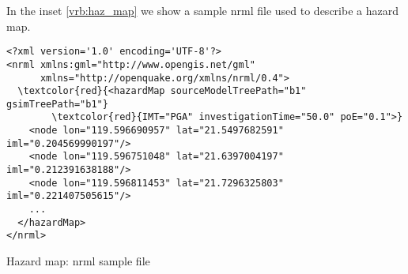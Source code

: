 In the inset \ref{vrb:haz_map} we show a sample nrml file used 
to describe a hazard map.
\begin{nrmlsmp}
\begin{Verbatim}[frame=single, commandchars=\\\{\}, fontsize=\small]
<?xml version='1.0' encoding='UTF-8'?>
<nrml xmlns:gml="http://www.opengis.net/gml" 
      xmlns="http://openquake.org/xmlns/nrml/0.4">
  \textcolor{red}{<hazardMap sourceModelTreePath="b1" gsimTreePath="b1"}
        \textcolor{red}{IMT="PGA" investigationTime="50.0" poE="0.1">}
    <node lon="119.596690957" lat="21.5497682591" iml="0.204569990197"/>
    <node lon="119.596751048" lat="21.6397004197" iml="0.212391638188"/>
    <node lon="119.596811453" lat="21.7296325803" iml="0.221407505615"/>
    ...
  </hazardMap>
</nrml>
\end{Verbatim}
\caption{Hazard map: nrml sample file}
\label{vrb:haz_map}
\end{nrmlsmp}
